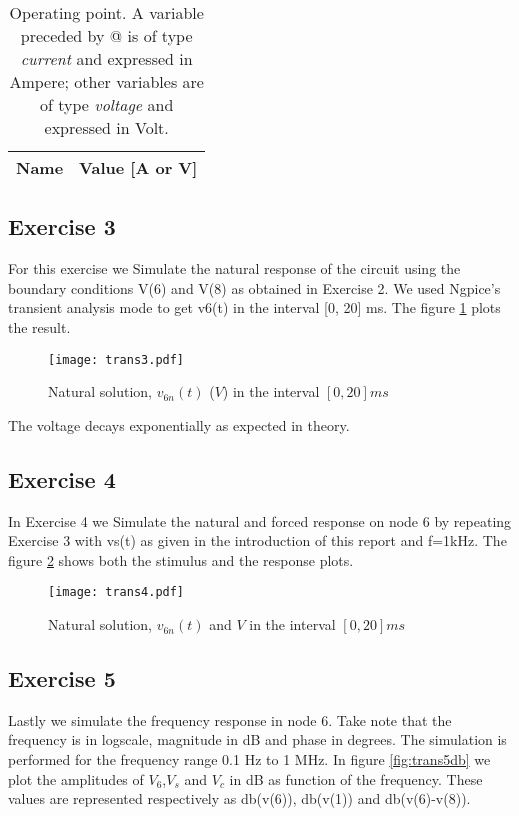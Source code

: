 \begin{table}[ht]
  \centering
  \begin{tabular}{|c|c|}
    \hline    
    {\bf Name} & {\bf Value [A or V]} \\ \hline
    
  \end{tabular}
  \vspace{20mm}
  \caption{Operating point. A variable preceded by @ is of type {\em current}
    and expressed in Ampere; other variables are of type {\it voltage} and expressed in
    Volt.}
  \label{tab:op2}
\end{table}

\newpage

\subsection{Exercise 3}
For this exercise we Simulate the natural response of the circuit 
using the boundary conditions V(6) and V(8) as obtained in Exercise 2.
We used Ngpice’s transient analysis mode to get v6(t) in the interval [0, 20] ms.
The figure \ref{fig:trans3} plots the result.

  \begin{figure}[ht] \centering
  \caption{Natural solution, $v_{6n}(t)$ ($V$) in the interval $[0,20]ms$}
  \texttt{[image: trans3.pdf]}
  \label{fig:trans3}
  \end{figure}
The voltage decays exponentially as expected in theory.
\newpage

\subsection{Exercise 4}
In Exercise 4 we Simulate the natural and forced response on node 6 by repeating Exercise  3 
with vs(t) as given in the introduction of this report and f=1kHz. 
The figure \ref{fig:trans4} shows both the stimulus and the response plots.

  \begin{figure}[ht] \centering
  \caption{Natural solution, $v_{6n}(t)$ and $V$ in the interval $[0,20]ms$}
  \texttt{[image: trans4.pdf]}
  \label{fig:trans4}
  \end{figure}

\newpage

\subsection{Exercise 5}
Lastly we simulate the frequency response in node 6.
Take note that the frequency is in logscale, magnitude in dB and phase in degrees.
The simulation is performed for the frequency range 0.1 Hz to 1 MHz.
In figure \ref{fig:trans5db} we plot the amplitudes of $V_{6}$,$V_{s}$ and $V_{c}$ in dB
as function of the frequency.
These values are represented respectively as db(v(6)), db(v(1)) and db(v(6)-v(8)).

